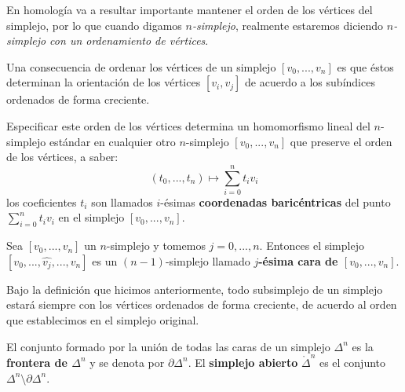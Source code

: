 \documentclass[12pt]{report}
\newcounter{it}
\theoremstyle{largebreak}
\begin{document}
    En homología va a resultar importante mantener el orden de los vértices del simplejo, por lo que cuando digamos \textit{$n$-simplejo}, realmente estaremos diciendo \textit{$n$-simplejo con un ordenamiento de vértices}.

    Una consecuencia de ordenar los vértices de un simplejo $[v_0,...,v_n]$ es que éstos determinan la orientación de los vértices $[v_i,v_j]$ de acuerdo a los subíndices ordenados de forma creciente.

    Especificar este orden de los vértices determina un homomorfismo lineal del $n$-simplejo estándar en cualquier otro $n$-simplejo $[v_0,...,v_n]$ que preserve el orden de los vértices, a saber:
    \begin{equation*}
        (t_0,...,t_n)\mapsto \sum_{ i=0}^n t_iv_i
    \end{equation*}
    los coeficientes $t_i$ son llamados $i$-ésimas \textbf{coordenadas baricéntricas} del punto $\sum_{ i=0}^n t_iv_i$ en el simplejo $[v_0,...,v_n]$.

    \begin{mydef}
        Sea $[v_0,...,v_n]$ un $n$-simplejo y tomemos $j=0,...,n$. Entonces el simplejo $[v_0,...,\hat{v_j},...,v_n]$ es un $(n-1)$-simplejo llamado \textbf{$j$-ésima cara de $[v_0,...,v_n]$}.
    \end{mydef}

    \begin{obs}
        Bajo la definición que hicimos anteriormente, todo subsimplejo de un simplejo estará siempre con los vértices ordenados de forma creciente, de acuerdo al orden que establecimos en el simplejo original. 
    \end{obs}

    \begin{mydef}
        El conjunto formado por la unión de todas las caras de un simplejo $\Delta^n$ es la \textbf{frontera de $\Delta^n$} y se denota por $\partial\Delta^n$. El \textbf{simplejo abierto} $\mathring{\Delta}^n$ es el conjunto $\Delta^n\setminus\partial\Delta^n$.
    \end{mydef}

    
\end{document}
